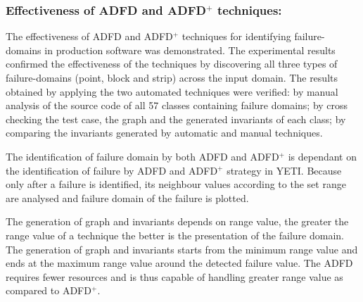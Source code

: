 






\subsubsection{Effectiveness of ADFD and ADFD$^+$ techniques:}
The effectiveness of ADFD and ADFD$^+$ techniques for identifying failure-domains in production software was demonstrated. The experimental results confirmed the effectiveness of the techniques by discovering all three types of failure-domains (point, block and strip) across the input domain. The results obtained by applying the two automated techniques were verified: by manual analysis of the source code of all 57 classes containing failure domains; by cross checking the test case, the graph and the generated invariants of each class; by comparing the invariants generated by automatic and manual techniques. 

The identification of failure domain by both ADFD and ADFD$^+$ is dependant on the identification of failure by ADFD and ADFD$^+$ strategy in YETI. Because only after a failure is identified, its neighbour values according to the set range are analysed and failure domain of the failure is plotted.

The generation of graph and invariants depends on range value, the greater the range value of a technique the better is the presentation of the failure domain. The generation of graph and invariants starts from the minimum range value and ends at the maximum range value around the detected failure value. The ADFD requires fewer resources and is thus capable of handling  greater range value as compared to ADFD$^+$.  




